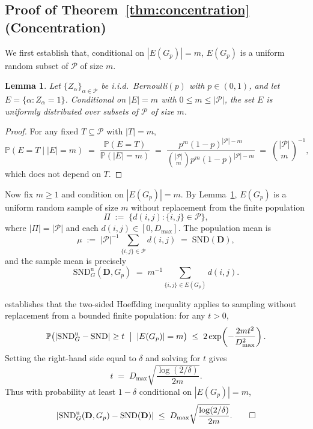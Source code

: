 \documentclass[11pt]{article}
\theoremstyle{plain}
\newtheorem{lemma}[theorem]{Lemma}
\theoremstyle{definition}
\theoremstyle{remark}
\newcommand{\Prob}{\mathbb{P}}
\newcommand{\Pairs}{\mathcal{P}}         %
\newcommand{\SND}{\ensuremath{\mathrm{SND}}}
\newcommand{\SNDG}{\mathrm{SND}_{G}}
\newcommand{\abs}[1]{\left\lvert #1 \right\rvert}
\begin{document}
\subsection*{Proof of Theorem~\ref{thm:concentration} (Concentration)}

We first establish that, conditional on $|E(G_p)| = m$, $E(G_p)$ is a
uniform random subset of $\Pairs$ of size $m$.

\begin{lemma}
\label{lem:conditional-uniform}
Let $\{Z_\alpha\}_{\alpha \in \Pairs}$ be i.i.d.\ Bernoulli$(p)$ with
$p \in (0,1)$, and let $E = \{\alpha : Z_\alpha = 1\}$. Conditional on
$|E| = m$ with $0 \leq m \leq |\Pairs|$, the set $E$ is uniformly
distributed over subsets of $\Pairs$ of size $m$.
\end{lemma}
\begin{proof}
For any fixed $T \subseteq \Pairs$ with $|T| = m$,
\[
\Prob(E = T \mid |E| = m)
\;=\; \frac{\Prob(E = T)}{\Prob(|E| = m)}
\;=\; \frac{p^m (1-p)^{|\Pairs|-m}}
          {\binom{|\Pairs|}{m} p^m (1-p)^{|\Pairs|-m}}
\;=\; \binom{|\Pairs|}{m}^{-1},
\]
which does not depend on $T$.
\end{proof}

Now fix $m \geq 1$ and condition on $|E(G_p)| = m$. By
Lemma~\ref{lem:conditional-uniform}, $E(G_p)$ is a uniform random sample
of size $m$ without replacement from the finite population
\[
\Pi \;:=\; \bigl\{ d(i,j) : \{i,j\} \in \Pairs \bigr\},
\]
where $|\Pi| = |\Pairs|$ and each $d(i,j) \in [0, D_{\max}]$. The
population mean is
\[
\mu \;:=\; |\Pairs|^{-1} \sum_{\{i,j\} \in \Pairs} d(i,j) \;=\; \SND(\mathbf{D}),
\]
and the sample mean is precisely
\[
\SNDG^{\mathrm{u}}(\mathbf{D}, G_p) \;=\; m^{-1} \sum_{\{i,j\} \in E(G_p)} d(i,j).
\]

\citet[Section 6, Theorem 4]{hoeffding1963probability} establishes that
the two-sided Hoeffding inequality applies to sampling without
replacement from a bounded finite population: for any $t > 0$,
\begin{equation}
\label{eq:hoeff-wor}
\Prob\bigl(\abs{\SNDG^{\mathrm{u}} - \SND} \geq t \;\bigm|\; |E(G_p)| = m\bigr)
\;\leq\; 2\exp\!\left(- \frac{2 m t^2}{D_{\max}^2}\right).
\end{equation}
Setting the right-hand side equal to $\delta$ and solving for $t$ gives
\[
t \;=\; D_{\max}\sqrt{\frac{\log(2/\delta)}{2m}}.
\]
Thus with probability at least $1 - \delta$ conditional on $|E(G_p)| = m$,
\[
\abs{\SNDG^{\mathrm{u}}(\mathbf{D}, G_p) - \SND(\mathbf{D})}
\;\leq\; D_{\max}\sqrt{\frac{\log(2/\delta)}{2m}}. \qed
\]
\end{document}

